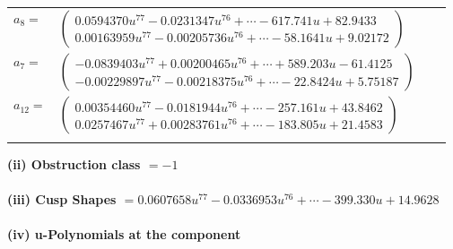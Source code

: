 \documentclass[1p]{elsarticle_modified}
\theoremstyle{definition}
\begin{document}
\begin{tabular}{m{7pt} m{180pt} m{7pt} m{180pt} }
\flushright $a_{8}=$&$\begin{pmatrix}0.0594370 u^{77}-0.0231347 u^{76}+\cdots-617.741 u+82.9433\\0.00163959 u^{77}-0.00205736 u^{76}+\cdots-58.1641 u+9.02172\end{pmatrix}$ \\
\flushright $a_{7}=$&$\begin{pmatrix}-0.0839403 u^{77}+0.00200465 u^{76}+\cdots+589.203 u-61.4125\\-0.00229897 u^{77}-0.00218375 u^{76}+\cdots-22.8424 u+5.75187\end{pmatrix}$ \\
\flushright $a_{12}=$&$\begin{pmatrix}0.00354460 u^{77}-0.0181944 u^{76}+\cdots-257.161 u+43.8462\\0.0257467 u^{77}+0.00283761 u^{76}+\cdots-183.805 u+21.4583\end{pmatrix}$\\&\end{tabular}
\flushleft \textbf{(ii) Obstruction class $= -1$}\\~\\
\flushleft \textbf{(iii) Cusp Shapes $= 0.0607658 u^{77}-0.0336953 u^{76}+\cdots-399.330 u+14.9628$}\\~\\
\newpage\renewcommand{\arraystretch}{1}
\flushleft \textbf{(iv) u-Polynomials at the component}\newline \\
\end{document}

